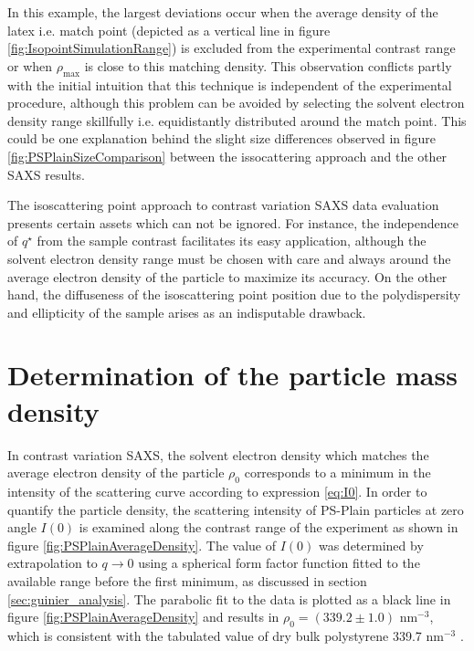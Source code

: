 In this example, the largest deviations occur when the average density of the latex i.e. match point (depicted as a vertical line in figure \ref{fig:IsopointSimulationRange}) is excluded from the experimental contrast range or when $\rho_{\text{max}}$ is close to this matching density. This observation conflicts partly with the initial intuition that this technique is independent of the experimental procedure, although this problem can be avoided by selecting the solvent electron density range skillfully i.e. equidistantly distributed around the match point. This could be one explanation behind the slight size differences observed in figure \ref{fig:PSPlainSizeComparison} between the issocattering approach and the other SAXS results.

The isoscattering point approach to contrast variation SAXS data evaluation presents certain assets which can not be ignored. For instance, the independence of $q^{\star}$ from the sample contrast facilitates its easy application, although the solvent electron density range must be chosen with care and always around the average electron density of the particle to maximize its accuracy. On the other hand, the diffuseness of the isoscattering point position due to the polydispersity and ellipticity of the sample arises as an indisputable drawback.

\section{Determination of the particle mass density}
\label{sec:physical_density}
In contrast variation SAXS, the solvent electron density which matches the average electron density of the particle $\rho_0$ corresponds to a minimum in the intensity of the scattering curve  according to expression \ref{eq:I0}. In order to quantify the particle density, the scattering intensity of PS-Plain particles at zero angle $I(0)$ is examined along the contrast range of the experiment as shown in figure \ref{fig:PSPlainAverageDensity}. The value of $I(0)$ was determined by extrapolation to $q\rightarrow 0$ using a spherical form factor function fitted to the available range before the first minimum, as discussed in section \ref{sec:guinier_analysis}. The parabolic fit to the data is plotted as a black line in figure \ref{fig:PSPlainAverageDensity} and results in $\rho_0=\left(339.2\pm1.0\right)$ nm$^{-3}$, which is consistent with the tabulated value of dry bulk polystyrene 339.7 nm$^{-3}$ \citep{dingenouts_analysis_1999}.


